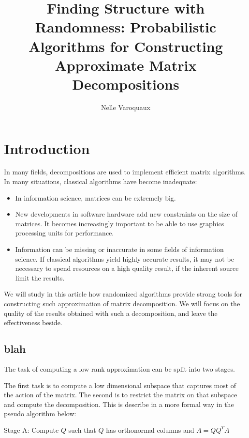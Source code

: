 \documentclass[onecolumn,12pt]{article}
\author{Nelle Varoquaux}
\title{Finding Structure with Randomness: Probabilistic Algorithms for
Constructing Approximate Matrix Decompositions}
\begin{document}
\maketitle
\begin{abstract}
\it{}
\end{abstract}

\tableofcontents

\section{Introduction}

In many fields, decompositions are used to implement efficient matrix
algorithms. In many situations, classical algorithms have become inadequate:

\begin{itemize}
\item In information science, matrices can be extremely big.
\item New developments in software hardware add new constraints on the size of
matrices. It becomes increasingly important to be able to use graphics
processing units for performance.
\item Information can be missing or inaccurate in some fields of information
science. If classical algorithms yield highly accurate results, it may not be
necessary to spend resources on a high quality result, if the inherent
source limit the results.
\end{itemize}

We will study in this article how randomized algorithms provide strong tools
for constructing such approximation of matrix decomposition. We will focus on
the quality of the results obtained with such a decomposition, and leave the
effectiveness beside.


\subsection{blah}
The task of computing a low rank approximation can be split into two stages.

The first task is to compute a low dimensional subspace that captures most of
the action of the matrix. The second is to restrict the matrix on that subspace
and compute the decomposition. This is describe in a more formal way in the
pseudo algorithm below:

Stage A: Compute $Q$ such that $Q$ has orthonormal columns and $A = Q Q^T A$
\end{document}

